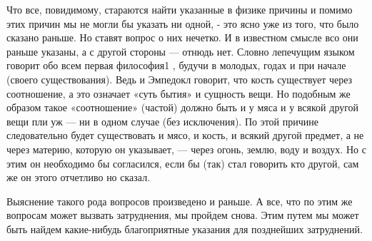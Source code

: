 \documentclass{article}
\begin{document}
Что все, повидимому, стараются найти указанные в физике причины и помимо этих причин мы не могли бы указать ни одной, - это ясно уже из того, что было сказано раньше.
\footnotemark[1]
Но ставят вопрос о них нечетко. И в известном смысле всо они раньше указаны, а с другой стороны — отнюдь нет.
\footnotemark[2]
Словно лепечущим языком говорит обо всем первая философия1 , будучи в молодых, годах и при начале (своего существования). Ведь и Эмпедокл говорит, что кость существует через соотношение,
\footnotemark[3]
а это означает «суть бытия» и сущность вещи. Но подобным же образом такое «соотношение» (частой) должно быть и у мяса и у всякой другой вещи пли уж — ни в одном случае (без исключения). По этой причине следовательно будет существовать и мясо, и кость, и всякий другой предмет, а не через материю, которую он указывает, — через огонь, землю, воду и воздух. Но с этим он необходимо бы согласился, если бы (так) стал говорить кто другой, сам же он этого отчетливо но сказал.
\footnotemark[4]

Выяснение такого рода вопросов произведено и раньше.
\footnotemark[5]
А все, что по этим же вопросам может вызвать затруднения, мы пройдем снова. Этим путем мы может быть найдем какие-нибудь благоприятные указания для позднейших затруднений.
\end{document}
